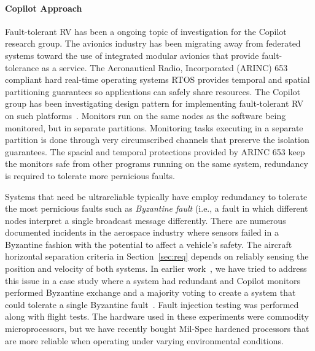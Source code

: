 \paragraph{Copilot Approach} Fault-tolerant RV has been a ongoing
topic of investigation for the Copilot research group. The avionics
industry has been migrating away from federated systems toward the use
of integrated modular avionics that provide fault-tolerance as a
service.  The Aeronautical Radio, Incorporated (ARINC)
653~\cite{ARINC653} compliant hard real-time operating systems RTOS
provides temporal and spatial partitioning guarantees so applications
can safely share resources.  The Copilot group has been investigating
design pattern for implementing fault-tolerant RV on such
platforms~\cite{Kaveh15}. Monitors run on the same nodes as the
software being monitored, but in separate partitions. Monitoring tasks
executing in a separate partition is done through very circumscribed
channels that preserve the isolation guarantees.  The spacial and
temporal protections provided by ARINC 653 keep the monitors safe from
other programs running on the same system, redundancy is required to
tolerate more pernicious faults.


Systems that need be ultrareliable typically have employ redundancy to
tolerate the most pernicious faults such as \emph{Byzantine fault}
(i.e., a fault in which different nodes interpret a single broadcast
message differently.  There are numerous documented incidents in the
aerospace industry where sensors failed in a Byzantine fashion with
the potential to affect a vehicle's safety.  The aircraft horizontal separation criteria in
Section~\ref{sec:req} depends on reliably sensing the position and
velocity of both systems. In earlier work~\cite{pike-isse-13}, we have
tried to address this issue in a case study where a system had
redundant and Copilot monitors performed Byzantine exchange and a
majority voting to create a system that could tolerate a single
Byzantine fault~\cite{pike-isse-13}.  Fault injection testing was
performed along with flight tests.  The hardware used in these
experiments were commodity microprocessors, but we have recently
bought Mil-Spec hardened processors that are more reliable when operating
under varying environmental conditions.




